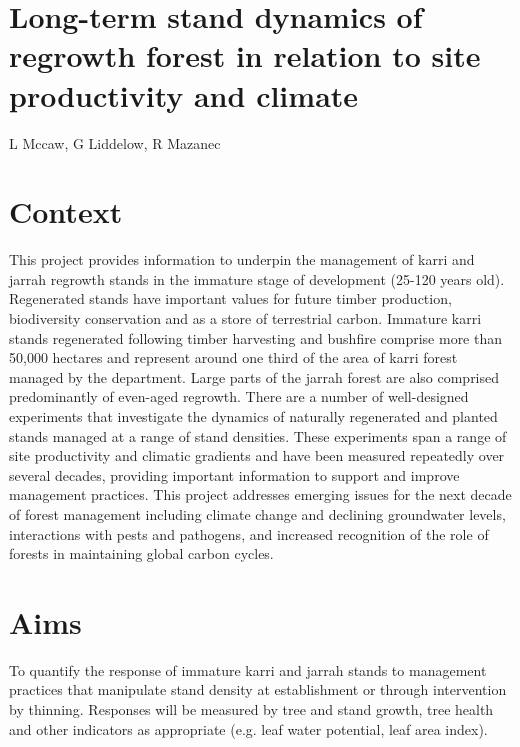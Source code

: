 \documentclass[version=last,
    paper=a4, %
    10pt, %
    usenames,
    dvipsnames,
    oneside, %
    headings=openany, %
    DIV=15 %
]{scrbook}
\begin{document}
\section*{Long-term stand dynamics of regrowth forest in relation to site
productivity and climate
}

L Mccaw, G Liddelow, R Mazanec


\section*{Context}
This project provides information to underpin the management of karri
and jarrah regrowth stands in the immature stage of development (25-120
years old). Regenerated stands have important values for future timber
production, biodiversity conservation and as a store of terrestrial
carbon. Immature karri stands regenerated following timber harvesting
and bushfire comprise more than 50,000 hectares and represent around one
third of the area of karri forest managed by the department. Large parts
of the jarrah forest are also comprised predominantly of even-aged
regrowth. There are a number of well-designed experiments that
investigate the dynamics of naturally regenerated and planted stands
managed at a range of stand densities. These experiments span a range of
site productivity and climatic gradients and have been measured
repeatedly over several decades, providing important information to
support and improve management practices. This project addresses
emerging issues for the next decade of forest management including
climate change and declining groundwater levels, interactions with pests
and pathogens, and increased recognition of the role of forests in
maintaining global carbon cycles.



\section*{Aims}
To quantify the response of immature karri and jarrah stands to
management practices that manipulate stand density at establishment or
through intervention by thinning. Responses will be measured by tree and
stand growth, tree health and other indicators as appropriate (e.g. leaf
water potential, leaf area index).
\end{document}
